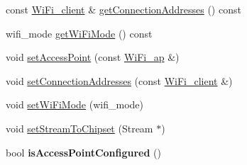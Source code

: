 \begin{DoxyCompactItemize}
const \mbox{\hyperlink{structathome_1_1communication_1_1wifi_1_1s__wifi__client}{Wi\+Fi\+\_\+client}} \& \mbox{\hyperlink{classathome_1_1communication_1_1wifi_1_1_a_wi_fi_communicator_afcc41f462a12c8348148c915dcafd1a0}{get\+Connection\+Addresses}} () const
\item 
wifi\+\_\+mode \mbox{\hyperlink{classathome_1_1communication_1_1wifi_1_1_a_wi_fi_communicator_adebc335ea6408a90919f396f06260b13}{get\+Wi\+Fi\+Mode}} () const
\item 
void \mbox{\hyperlink{classathome_1_1communication_1_1wifi_1_1_a_wi_fi_communicator_a2b802d934022436e029fc31b3e84d321}{set\+Access\+Point}} (const \mbox{\hyperlink{structathome_1_1communication_1_1wifi_1_1s__wifi__access__point}{Wi\+Fi\+\_\+ap}} \&)
\item 
void \mbox{\hyperlink{classathome_1_1communication_1_1wifi_1_1_a_wi_fi_communicator_a31fb91672f298718d99bb9776dfe46c9}{set\+Connection\+Addresses}} (const \mbox{\hyperlink{structathome_1_1communication_1_1wifi_1_1s__wifi__client}{Wi\+Fi\+\_\+client}} \&)
\item 
void \mbox{\hyperlink{classathome_1_1communication_1_1wifi_1_1_a_wi_fi_communicator_a28538cf510da8b59056b2533a6e53bcc}{set\+Wi\+Fi\+Mode}} (wifi\+\_\+mode)
\item 
void \mbox{\hyperlink{classathome_1_1communication_1_1wifi_1_1_a_wi_fi_communicator_a42f2ad88713db57bd9e9670f090924de}{set\+Stream\+To\+Chipset}} (Stream $\ast$)
\item 
\mbox{\label{classathome_1_1communication_1_1wifi_1_1_a_wi_fi_communicator_a9743bf55f6145e641e3cf35a072c14e1}} 
bool {\bfseries is\+Access\+Point\+Configured} ()
\end{DoxyCompactItemize}
